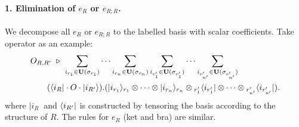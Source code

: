 \paragraph*{1. Elimination of $e_R$ or $e_{R;R}$.}
We decompose all $e_R$ or $e_{R;R}$ to the labelled basis with scalar coefficients. 
Take operator as an example:
\begin{align*}
    & O_{R,R'} \ \triangleright\ \sum_{i_{r_1}\in\mathbf{U}(\sigma_{r_1})}\cdots \sum_{i_{r_n}\in\mathbf{U}(\sigma_{r_n})}
    \sum_{i_{r'_1}\in\mathbf{U}(\sigma_{r'_1})}\cdots \sum_{i_{r'_{n'}}\in\mathbf{U}(\sigma_{r'_{n'}})} \\
    & \qquad (\langle i_R|\cdot O\cdot |i_{R'}\rangle).(|i_{r_1}\rangle_{r_1}\otimes\cdots\otimes|i_{r_n}\rangle_{r_n} \otimes {}_{r'_1}\langle i_{r'_1}|\otimes\cdots\otimes{}_{r'_{n'}}\langle i_{r'_{n'}}|).
\end{align*}
where $|i_R\>$ and $\langle i_{R'}|$ is constructed by tensoring the basis according to the structure of $R$. The rules for $e_R$ (ket and bra) are similar.


